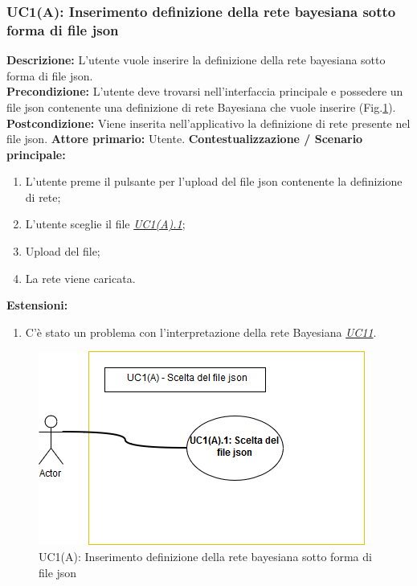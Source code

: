                         
                \subsubsection{UC1(A): Inserimento definizione della rete bayesiana sotto forma di file json}
                    \textbf{Descrizione:} L’utente vuole inserire la definizione della rete bayesiana sotto forma di file json.\\
                    \textbf{Precondizione:}  L’utente deve trovarsi nell'interfaccia principale e possedere un file json contenente una definizione di rete Bayesiana che vuole inserire (Fig.\ref{uc1a}).
                    \newline
                    \textbf{Postcondizione:} Viene inserita nell'applicativo la definizione di rete presente nel file json.
                    \newline
                    \textbf{Attore primario:} Utente.
                    \newline
                    \textbf{Contestualizzazione / Scenario principale:} \begin{enumerate}
                        \item L’utente preme il pulsante per l’upload del file json contenente la definizione di rete;
                        \item L’utente sceglie il file \underline{\textit{UC1(A).1}};
                        \item Upload del file;
                        \item La rete viene caricata.
                    \end{enumerate}
                    
                    \textbf{Estensioni:} \begin{enumerate}
                            \item C’è stato un problema con l’interpretazione della rete Bayesiana \underline{\textit{UC11}}.
                        \end{enumerate}
                        
                    \begin{figure}[!htbp]
                    	\centering
                    	\includegraphics[scale=0.8]{UC1(A).png}
                    	\caption{UC1(A): Inserimento definizione della rete bayesiana sotto forma di file json}
                    	\label{uc1a}
                    \end{figure}
                    
